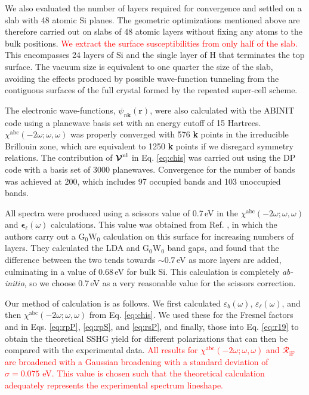 \documentclass[prb,superscriptaddress,showpacs,twocolumn,letterpaper]{revtex4}
\newcommand{\correction}[1]{\textcolor{red}{#1}}
\begin{document}
We also evaluated the number of layers required for convergence and settled on a
slab with 48 atomic Si planes. The geometric optimizations mentioned above are
therefore carried out on slabs of 48 atomic layers without fixing any atoms to
the bulk positions.
\correction{We extract the surface susceptibilities from only half of the slab.}
This encompasses 24 layers of Si and the single layer of H that
terminates the top surface. The vacuum size is equivalent to one quarter the
size of the slab, avoiding the effects produced by possible wave-function
tunneling from the contiguous surfaces of the full crystal formed by the
repeated super-cell scheme.\cite{mendozaPRB06}

The electronic wave-functions, $\psi_{n\mathbf{k}}(\mathbf{r})$, were also
calculated with the ABINIT code using a planewave basis set with an energy
cutoff of 15 Hartrees. $\chi^{\mathrm{abc}}(-2\omega;\omega,\omega)$ was
properly converged with 576 \textbf{k} points in the irreducible Brillouin zone,
which are equivalent to 1250 \textbf{k} points if we disregard symmetry
relations. The contribution of $\boldsymbol{\mathcal{\cal V}}^\mathrm{nl}$ in
Eq. \eqref{eq:chis} was carried out using the DP\cite{olevanoDP} code with a
basis set of 3000 planewaves. Convergence for the number of bands was achieved
at 200, which includes 97 occupied bands and 103 unoccupied bands.

All spectra were produced using a scissors value of 0.7\,eV in the
$\chi^{\mathrm{abc}}(-2\omega;\omega,\omega)$ and
$\boldsymbol{\epsilon}_{\ell}(\omega)$ calculations. This value was obtained
from Ref. , in which the authors carry out a
$\mathrm{G}_{0}\mathrm{W}_{0}$ calculation on this surface for increasing
numbers of layers. They calculated the LDA and $\mathrm{G}_{0}\mathrm{W}_{0}$
band gaps, and found that the difference between the two tends towards
$\sim0.7$\,eV as more layers are added, culminating in a value of 0.68\,eV for
bulk Si. This calculation is completely \emph{ab-initio}, so we choose 0.7\,eV
as a very reasonable value for the scissors correction.

Our method of calculation is as follows. We first calculated
$\varepsilon_{b}(\omega)$, $\varepsilon_{\ell}(\omega)$, and then
$\chi^{\mathrm{abc}}(-2\omega;\omega,\omega)$ from Eq. \eqref{eq:chis}. We used
these for the Fresnel factors and in Eqs. \eqref{eq:rpP}, \eqref{eq:rpS}, and
\eqref{eq:rsP}, and finally, those into Eq. \eqref{eq:r19} to obtain the
theoretical SSHG yield for different polarizations that can then be compared
with the experimental data.
\correction{All results for $\chi^{\mathrm{abc}}(-2\omega;\omega,\omega)$ and
${\mathcal R_{\mathrm{iF}}}$ are broadened with a Gaussian broadening with a
standard deviation of $\sigma=0.075$ eV. This value is chosen such that the
theoretical calculation adequately  represents the experimental spectrum
lineshape.} %
\end{document}
